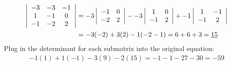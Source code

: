 \documentclass[]{article}
\newcommand{\detmat}[1]{
	\left|\hspace{0.5em}
	\begin{matrix}
		#1
	\end{matrix}
	\hspace{0.5em}\right|
}
\begin{document}
	\begin{align*}
		\detmat{-3&-3&-1\\1&-1&0\\-1&-2&2} &= -3\detmat{-1&0\\-2&2} --3\detmat{1&0\\-1&2} +-1\detmat{1&-1\\-1&2}\\
		&= -3(-2) + 3(2) - 1(-2-1) = 6 + 6 + 3 = \underline{15}
	\end{align*}
	Plug in the determinant for each submatrix into the original equation:
	\begin{align*}
		-1(1) + 1(-1) -3(9) - 2(15) = -1 - 1 - 27 - 30 = \boxed{-59}
	\end{align*}
	\section{}
\end{document}
